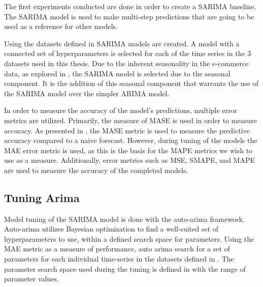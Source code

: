 \iffalse



  The first experiments conducted are done in order to create a SARIMA baseline.
  The SARIMA model is used to make multi-step predictions that are going to be used as a reference for other models.

  Using the datasets defined in  SARIMA models are created.
  A model with a connected set of hyperparameters is selected for each of the time series in the 3 datasets used in this thesis.
  Due to the inherent seasonality in the e-commerce data, as explored in ,
  the SARIMA model is selected due to the seasonal component.
  It is the addition of this seasonal component that warrants the use of the SARIMA model over the simpler ARIMA model.

  In order to measure the accuracy of the model's predictions, multiple error metrics are utilized.
  Primarily, the measure of MASE is used in order to measure accuracy.
  As presented in , the MASE metric is used to measure the predictive accuracy
  compared to a naive forecast.
  However, during tuning of the models the MAE error metric is used, as this is the basis for the MAPE metrics we wish to use as a measure.
  Additionally, error metrics such as MSE, SMAPE, and MAPE are used to measure the accuracy of the completed models.

  \subsection{Tuning Arima}
  Model tuning of the SARIMA model is done with the auto-arima framework.
  Auto-arima utilizes Bayesian optimization to find a well-suited set of hyperparameters to use,
  within a defined search space for parameters.
  Using the MAE metric as a measure of performance, auto arima search for a set of parameters for each individual time-series
  in the datasets defined in .
  The parameter search space used during the tuning is defined in  with the range of parameter values.

